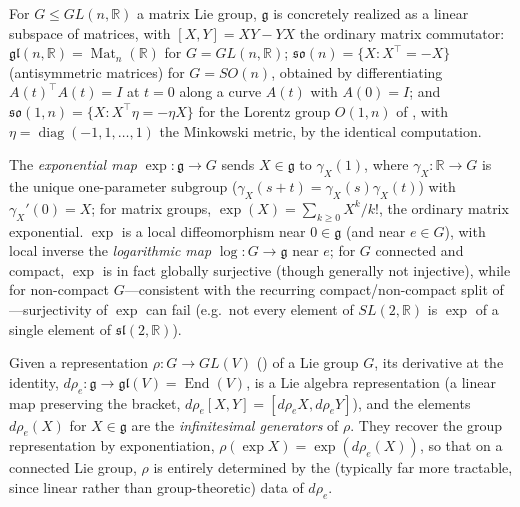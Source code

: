 \documentclass[mathematics,review,submit,moreauthors]{Definitions/mdpi}
\begin{document}
\begin{Example}
\label{ex:matrix-lie-algebras}
For $G \leq GL(n,\mathbb{R})$ a matrix Lie group, $\mathfrak{g}$ is
concretely realized as a linear subspace of matrices, with
$[X,Y] = XY - YX$ the ordinary matrix commutator:
$\mathfrak{gl}(n,\mathbb{R}) = \operatorname{Mat}_n(\mathbb{R})$ for
$G = GL(n,\mathbb{R})$; $\mathfrak{so}(n) = \{X : X^\top = -X\}$
(antisymmetric matrices) for $G = SO(n)$, obtained by differentiating
$A(t)^\top A(t) = I$ at $t=0$ along a curve $A(t)$ with $A(0)=I$; and
$\mathfrak{so}(1,n) = \{X : X^\top \eta = -\eta X\}$ for the Lorentz group
$O(1,n)$ of , with $\eta = \operatorname{diag}(-1,1,\dots,1)$
the Minkowski metric, by the identical computation.
\end{Example}

\begin{Definition}
\label{def:exp-log-map}
The \emph{exponential map} $\exp : \mathfrak{g} \to G$ sends $X \in
\mathfrak{g}$ to $\gamma_X(1)$, where $\gamma_X : \mathbb{R} \to G$ is the
unique one-parameter subgroup ($\gamma_X(s+t) = \gamma_X(s)\gamma_X(t)$)
with $\gamma_X'(0) = X$; for matrix groups, $\exp(X) = \sum_{k \geq 0}
X^k/k!$, the ordinary matrix exponential. $\exp$ is a local
diffeomorphism near $0 \in \mathfrak{g}$ (and near $e \in G$), with local
inverse the \emph{logarithmic map} $\log : G \to \mathfrak{g}$ near $e$; for
$G$ connected and compact, $\exp$ is in fact globally surjective (though
generally not injective), while for non-compact $G$---consistent with the
recurring compact/non-compact split of
---surjectivity of $\exp$ can
fail (e.g.\ not every element of $SL(2,\mathbb{R})$ is $\exp$ of a single
element of $\mathfrak{sl}(2,\mathbb{R})$).
\end{Definition}

\begin{Definition}
\label{def:infinitesimal-generators}
Given a representation $\rho : G \to GL(V)$
() of a Lie group $G$, its
derivative at the identity, $d\rho_e : \mathfrak{g} \to \mathfrak{gl}(V) =
\operatorname{End}(V)$, is a Lie algebra representation (a linear map preserving
the bracket, $d\rho_e[X,Y] = [d\rho_e X, d\rho_e Y]$), and the elements
$d\rho_e(X)$ for $X \in \mathfrak{g}$ are the \emph{infinitesimal
generators} of $\rho$. They recover the group representation by
exponentiation, $\rho(\exp X) = \exp(d\rho_e(X))$, so that on a connected
Lie group, $\rho$ is entirely determined by the (typically far more
tractable, since linear rather than group-theoretic) data of $d\rho_e$.
\end{Definition}
\end{document}

